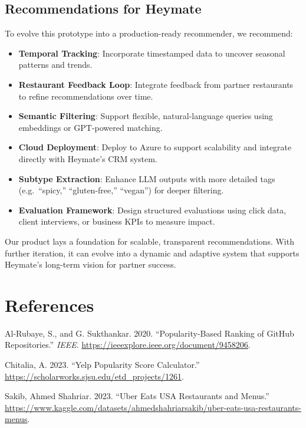 \documentclass[
  11pt,
  a4paper,
  DIV=11,
  numbers=noendperiod]{scrartcl}
\providecommand{\tightlist}{%
  \setlength{\itemsep}{0pt}\setlength{\parskip}{0pt}}\usepackage{longtable,booktabs,array}
\newlength{\cslhangindent}
\newenvironment{CSLReferences}[2] %
 {\begin{list}{}{%
  \setlength{\itemindent}{0pt}
  \setlength{\leftmargin}{0pt}
  \setlength{\parsep}{0pt}
  \ifodd #1
   \setlength{\leftmargin}{\cslhangindent}
   \setlength{\itemindent}{-1\cslhangindent}
  \fi
  \setlength{\itemsep}{#2\baselineskip}}}
 {\end{list}}
\begin{document}
\subsection{Recommendations for
Heymate}\label{recommendations-for-heymate}

To evolve this prototype into a production-ready recommender, we
recommend:

\begin{itemize}
\tightlist
\item
  \textbf{Temporal Tracking}: Incorporate timestamped data to uncover
  seasonal patterns and trends.
\item
  \textbf{Restaurant Feedback Loop}: Integrate feedback from partner
  restaurants to refine recommendations over time.
\item
  \textbf{Semantic Filtering}: Support flexible, natural-language
  queries using embeddings or GPT-powered matching.
\item
  \textbf{Cloud Deployment}: Deploy to Azure to support scalability and
  integrate directly with Heymate's CRM system.
\item
  \textbf{Subtype Extraction}: Enhance LLM outputs with more detailed
  tags (e.g.~``spicy,'' ``gluten-free,'' ``vegan'') for deeper
  filtering.
\item
  \textbf{Evaluation Framework}: Design structured evaluations using
  click data, client interviews, or business KPIs to measure impact.
\end{itemize}

Our product lays a foundation for scalable, transparent recommendations.
With further iteration, it can evolve into a dynamic and adaptive system
that supports Heymate's long-term vision for partner success.

\newpage{}

\section*{References}\label{references}

\label{refs}
\begin{CSLReferences}{1}{0}
Al-Rubaye, S., and G. Sukthankar. 2020. {``Popularity-Based Ranking of
GitHub Repositories.''} \emph{IEEE}.
\url{https://ieeexplore.ieee.org/document/9458206}.

Chitalia, A. 2023. {``Yelp Popularity Score Calculator.''}
\url{https://scholarworks.sjsu.edu/etd_projects/1261}.

Sakib, Ahmed Shahriar. 2023. {``Uber Eats USA Restaurants and Menus.''}
\url{https://www.kaggle.com/datasets/ahmedshahriarsakib/uber-eats-usa-restaurants-menus}.

\end{CSLReferences}
\end{document}
